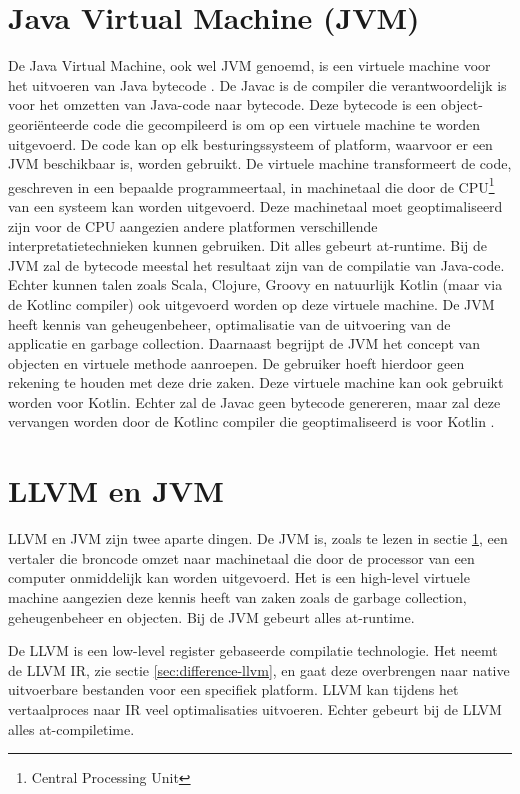 \section{Java Virtual Machine (JVM)}
\label{sec:jvm}
De Java Virtual Machine, ook wel JVM genoemd, is een virtuele machine voor het uitvoeren van Java bytecode \autocite{TechopediaBytecode}. De Javac is de compiler die verantwoordelijk is voor het omzetten van Java-code naar bytecode. Deze bytecode is een object-georiënteerde code die gecompileerd is om op een virtuele machine te worden uitgevoerd. De code kan op elk besturingssysteem of platform, waarvoor er een JVM beschikbaar is, worden gebruikt. De virtuele machine transformeert de code, geschreven in een bepaalde programmeertaal, in machinetaal die door de CPU\footnote{Central Processing Unit} van een systeem kan worden uitgevoerd. Deze machinetaal moet geoptimaliseerd zijn voor de CPU aangezien andere platformen verschillende interpretatietechnieken kunnen gebruiken. Dit alles gebeurt at-runtime. Bij de JVM zal de bytecode meestal het resultaat zijn van de compilatie van Java-code. Echter kunnen talen zoals Scala, Clojure, Groovy en natuurlijk Kotlin (maar via de Kotlinc compiler) ook uitgevoerd worden op deze virtuele machine. De JVM heeft kennis van geheugenbeheer, optimalisatie van de uitvoering van de applicatie en garbage collection. Daarnaast begrijpt de JVM het concept van objecten en virtuele methode aanroepen. De gebruiker hoeft hierdoor geen rekening te houden met deze drie zaken. Deze virtuele machine kan ook gebruikt worden voor Kotlin. Echter zal de Javac geen bytecode genereren, maar zal deze vervangen worden door de Kotlinc compiler die geoptimaliseerd is voor Kotlin \autocite{TechopediaJVM}. 

\section{LLVM en JVM}
LLVM en JVM zijn twee aparte dingen. De JVM is, zoals te lezen in sectie \ref{sec:jvm}, een vertaler die broncode omzet naar machinetaal die door de processor van een computer onmiddelijk kan worden uitgevoerd. Het is een high-level virtuele machine aangezien deze kennis heeft van zaken zoals de garbage collection, geheugenbeheer en objecten. Bij de JVM gebeurt alles at-runtime. 

De LLVM is een low-level register gebaseerde compilatie technologie. Het neemt de LLVM IR, zie sectie \ref{sec:difference-llvm}, en gaat deze overbrengen naar native uitvoerbare bestanden voor een specifiek platform. LLVM kan tijdens het vertaalproces naar IR veel optimalisaties uitvoeren. Echter gebeurt bij de LLVM alles at-compiletime.
